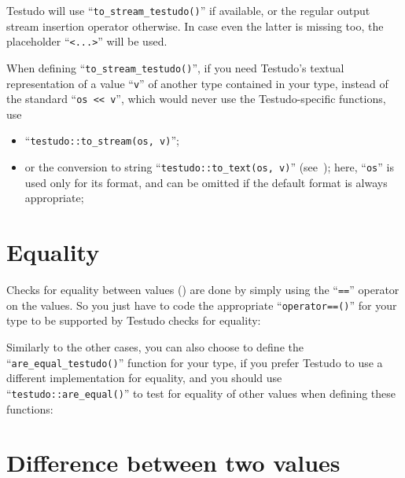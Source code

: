 \documentclass[twoside, a4paper, article]{memoir}
\newcommand\typesetexample[1]{%
  \typesetexamplesource{#1}
}
\providecommand\typesetexamplesource[1]{%
}
\begin{document}
Testudo will use ``\texttt{to\_stream\_testudo()}'' if available, or the
regular output stream insertion operator otherwise.  In case even the latter is
missing too, the placeholder ``\texttt{<...>}'' will be used.

When defining ``\texttt{to\_stream\_testudo()}'', if you need Testudo's textual
representation of a value ``\texttt{v}'' of another type contained in your
type, instead of the standard ``\texttt{os <{}< v}'', which would never use the
Testudo-specific functions, use
\begin{itemize}
\item ``\texttt{testudo::to\_stream(os, v)}'';

  \typesetexample{testudo-support-my-vector-to-stream-testudo-to-stream}

\item or the conversion to string ``\texttt{testudo::to\_text(os, v)}''
  (see~); here, ``\texttt{os}''
  is used only for its format, and can be omitted if the default format is
  always appropriate;

  \typesetexample{testudo-support-my-vector-to-stream-testudo-to-text}

\end{itemize}


\section{Equality}
\label{sec:equality}

Checks for equality between values
() are done by simply using the
``\texttt{==}'' operator on the values.  So you just have to code the
appropriate ``\texttt{operator==()}'' for your type to be supported by Testudo
checks for equality:

\typesetexample{testudo-support-my-pair-equality}

Similarly to the other cases, you can also choose to define the
``\texttt{are\_equal\_testudo()}'' function for your type, if you prefer
Testudo to use a different implementation for equality, and you should use
``\texttt{testudo::are\_equal()}'' to test for equality of other values when
defining these functions:

\typesetexample{testudo-support-my-pair-are-equal-testudo}

\section{Difference between two values}
\label{sec:difference-between-two-values}
\end{document}
